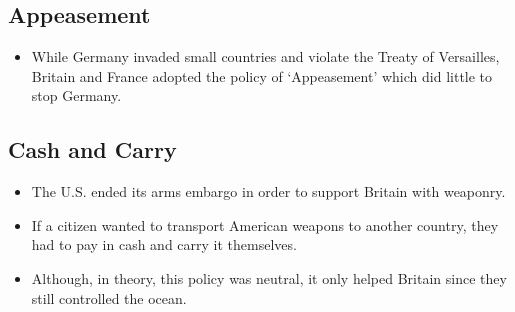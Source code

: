 \documentclass[12pt]{article} %
\begin{document}
	\subsection{Appeasement}
	\begin{itemize}
		\item While Germany invaded small countries and violate the Treaty of Versailles, Britain and France
			adopted the policy of `Appeasement' which did little to stop Germany.
	\end{itemize}

	\subsection{Cash and Carry}
	\begin{itemize}
		\item The U.S. ended its arms embargo in order to support Britain with weaponry.
		\item If a citizen wanted to transport American weapons to another country, they had to pay in cash
			and carry it themselves.
		\item Although, in theory, this policy was neutral, it only helped Britain since they still controlled
			the ocean.
	\end{itemize}






	\newpage
\end{document}
